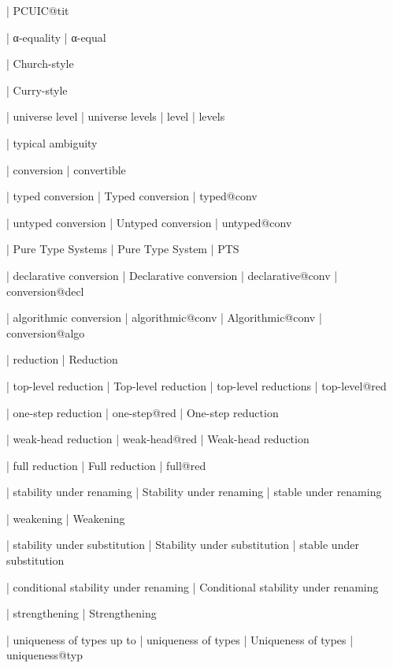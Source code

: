  | PCUIC@tit

  | α-equality
  | α-equal

  | Church-style

  | Curry-style

  | universe level
  | universe levels
  | level
  | levels

  | typical ambiguity


  | conversion
  | convertible

  | typed conversion
  | Typed conversion
  | typed@conv

  | untyped conversion
  | Untyped conversion
  | untyped@conv

  | Pure Type Systems
  | Pure Type System
  | PTS

  | declarative conversion
  | Declarative conversion
  | declarative@conv
  | conversion@decl

  | algorithmic conversion
  | algorithmic@conv
  | Algorithmic@conv
  | conversion@algo

  | reduction
  | Reduction

  | top-level reduction
  | Top-level reduction
  | top-level reductions
  | top-level@red

  | one-step reduction
  | one-step@red
  | One-step reduction

  | weak-head reduction
  | weak-head@red
  | Weak-head reduction

  | full reduction
  | Full reduction
  | full@red

  | stability under renaming
  | Stability under renaming
  | stable under renaming

  | weakening
  | Weakening

  | stability under substitution
  | Stability under substitution
  | stable under substitution

  | conditional stability under renaming
  | Conditional stability under renaming


  | strengthening
  | Strengthening

  | uniqueness of types up to
  | uniqueness of types
  | Uniqueness of types
  | uniqueness@typ

